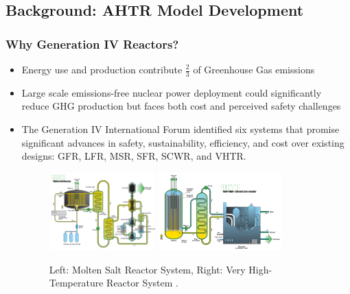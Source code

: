 \subsection{Background: AHTR Model Development}
    \begin{frame}
        \frametitle{Why Generation IV Reactors?}
        \begin{itemize}
        \item Energy use and production contribute $\frac{2}{3}$ of Greenhouse Gas 
        emissions \cite{noauthor_climate_2018}
        \item  Large scale emissions-free nuclear power deployment could 
        significantly reduce GHG production but faces both cost and perceived 
        safety challenges 
        \item The Generation IV International Forum identified six systems 
        that promise significant advances in safety, sustainability, efficiency, 
        and cost over existing designs: GFR, LFR, MSR, SFR, SCWR, and VHTR. 
        \begin{figure}[htbp!]
            \includegraphics[height=3cm]{figures/msr}
            \hspace{1cm}
            \includegraphics[height=3cm]{figures/vhtr}
            \caption{Left: Molten Salt Reactor System, Right: Very High-Temperature
            Reactor System \cite{gif_technology_2002}. }
        \end{figure}
        \end{itemize}
    \end{frame}
